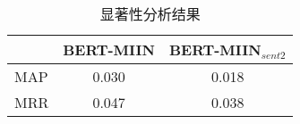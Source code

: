 \begin{table}[h]
    \caption{显著性分析结果}
    \centering
    \newcommand{\tabincell}[2]{\begin{tabular}{@{}#1@{}}#2\end{tabular}}
    \begin{tabular}{l|c|c}
    \toprule[0.7pt]
    & \enspace \textbf{BERT-MIIN} \enspace& \enspace \textbf{BERT-MIIN$_{sent2}$} \enspace\\
    \midrule[0.7pt]

    MAP\qquad\quad & 0.030 & 0.018 \\
    MRR & 0.047 & 0.038 \\

    \bottomrule[0.7pt]
    \end{tabular}
    \label{table3-3}
\end{table}